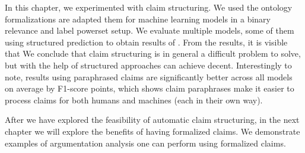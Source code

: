 In this chapter, we experimented with claim structuring. 
We used the ontology formalizations are adapted them for 
machine learning models in a binary relevance and label powerset setup. 
We evaluate multiple models, some of them using structured prediction to obtain 
results of . From the results, it is 
visible that 
We conclude that claim structuring is in general a difficult problem to solve,
but with the help of structured approaches can achieve decent. 
Interestingly to note, results using paraphrased claims are significantly
better across all models on average by F1-score points, which shows claim
paraphrases make it easier to process claims for both humans and machines (each
in their own way). 

After we have explored the feasibility of automatic claim structuring, in the
next chapter we will explore the benefits of having formalized claims. 
We demonstrate examples of argumentation analysis one can perform using
formalized claims. 

